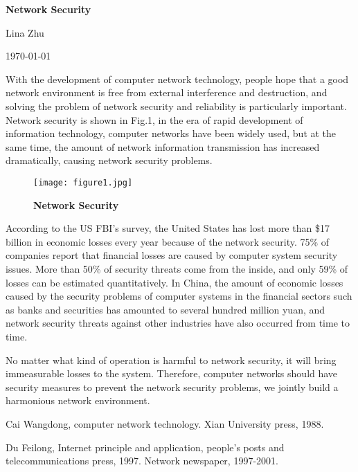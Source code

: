 \documentclass[a4paper,12pt,twocolumn]{article}
\begin{document}
	\begin{center}
		
		{\bfseries \LARGE  Network Security} 
		
	\end{center}
	\begin{center}
		Lina Zhu
	\end{center}
	\begin{center}
		\today
	\end{center}
	
	\par With the development of computer network technology, people hope that a good network environment is free from external interference and destruction, and solving the problem of network security and reliability is particularly important. Network security is shown in Fig.1, in the era of rapid development of information technology, computer networks have been widely used, but at the same time, the amount of network information transmission has increased dramatically, causing network security problems.
	\begin{figure}[htp]
		\centering
		\texttt{[image: figure1.jpg]}
		\caption{\bfseries{Network Security}}\label{pic1}
	\end{figure}
\par According to the US FBI's survey, the United States has lost more than \$17 billion in economic losses every year because of the network security. 75\% of companies report that financial losses are caused by computer system security issues. More than 50\% of security threats come from the inside, and only 59\% of losses can be estimated quantitatively. In China, the amount of economic losses caused by the security problems of computer systems in the financial sectors such as banks and securities has amounted to several hundred million yuan, and network security threats against other industries have also occurred from time to time.
\par	No matter what kind of operation is harmful to network security, it will bring immeasurable losses to the system. Therefore, computer networks should have security measures to prevent the network security problems, we jointly build a harmonious network environment.
	\begin{thebibliography}{99}
	   Cai Wangdong, computer network technology. Xian University press, 1988.
	
	   Du Feilong, Internet principle and application, people's posts and telecommunications press, 1997.
	   Network newspaper, 1997-2001.
\end{thebibliography}
\end{document}
